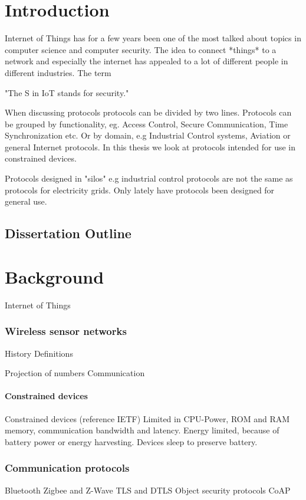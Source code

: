 \chapter{Introduction}
Internet of Things has for a few years been one of the most talked about topics in computer science and computer security. The idea to connect *things* to a network and especially the internet has appealed to a lot of different people in different industries. The term 

"The S in IoT stands for security."



When discussing protocols protocols can be divided by two lines. Protocols can be grouped by functionality, eg. Access Control, Secure Communication, Time Synchronization etc. Or by domain, e.g Industrial Control systems, Aviation or general Internet protocols. 
In this thesis we look at protocols intended for use in constrained devices. 

Protocols designed in "silos" e.g industrial control protocols are not the same as protocols for electricity grids. 
Only lately have protocols been designed for general use. 

\section{Dissertation Outline}
\chapter{Background}
Internet of Things 
\subsection{Wireless sensor networks}
History
Definitions

Projection of numbers
Communication

\subsubsection{Constrained devices}
Constrained devices (reference IETF)
Limited in CPU-Power, ROM and RAM memory, communication bandwidth and latency. Energy limited, because of battery power or energy harvesting.
Devices sleep to preserve battery.


\subsection{Communication protocols}
Bluetooth
Zigbee and Z-Wave
TLS and DTLS
Object security protocols
CoAP

